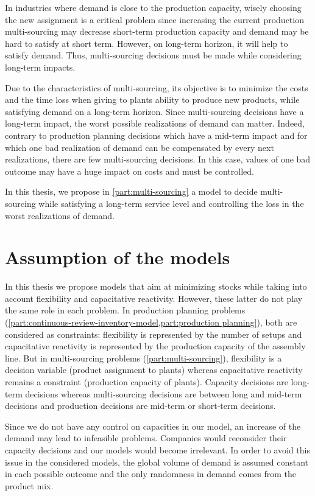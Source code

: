 In industries where demand is close to the production capacity, wisely choosing the new assignment is a critical problem since increasing the current production multi-sourcing may decrease short-term production capacity and demand may be hard to satisfy at short term.
However, on long-term horizon, it will help to satisfy demand.
Thus, multi-sourcing decisions must be made while considering long-term impacts.


Due to the characteristics of multi-sourcing, its objective is to minimize the costs and the time loss when giving to plants ability to produce new products, while satisfying demand on a long-term horizon.
Since multi-sourcing decisions have a long-term impact, the worst possible realizations of demand can matter.
Indeed, contrary to production planning decisions which have a mid-term impact and for which one bad realization of demand can be compensated by every next realizations, there are few multi-sourcing decisions.
In this case, values of one bad outcome may have a huge impact on costs and must be controlled.


\medskip


In this thesis, we propose in \cref{part:multi-sourcing} a model to decide multi-sourcing while satisfying a long-term service level and controlling the loss in the worst realizations of demand.


\section{Assumption of the models}


In this thesis we propose models that aim at minimizing stocks while taking into account flexibility and capacitative reactivity.
However, these latter do not play the same role in each problem.
In production planning problems (\cref{part:continuous-review-inventory-model,part:production planning}), both are considered as constraints: flexibility is represented by the number of setups and capacitative reactivity is represented by the production capacity of the assembly line.
But in multi-sourcing problems (\cref{part:multi-sourcing}), flexibility is a decision variable (product assignment to plants) whereas capacitative reactivity remains a constraint (production capacity of plants).
Capacity decisions are long-term decisions whereas multi-sourcing decisions are between long and mid-term decisions and production decisions are mid-term or short-term decisions.


Since we do not have any control on capacities in our model, an increase of the demand may lead to infeasible problems.
Companies would reconsider their capacity decisions and our models would become irrelevant.
In order to avoid this issue in the considered models, the global volume of demand is assumed constant in each possible outcome and the only randomness in demand comes from the product mix.



